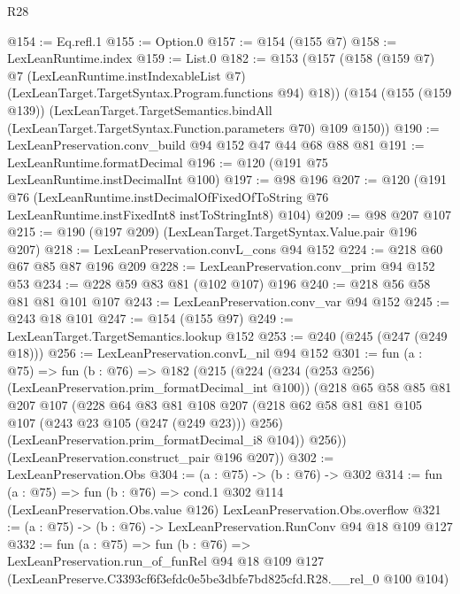 \begin{lexlean}{R28}
\begin{coremodule}
@154 := Eq.refl.{1}
@155 := Option.{0}
@157 := @154 (@155 @7)
@158 := LexLeanRuntime.index
@159 := List.{0}
@182 := @153
    (@157
      (@158
        (@159 @7)
        @7
        (LexLeanRuntime.instIndexableList @7)
        (LexLeanTarget.TargetSyntax.Program.functions @94)
        @18))
    (@154
      (@155 (@159 @139))
      (LexLeanTarget.TargetSemantics.bindAll
        (LexLeanTarget.TargetSyntax.Function.parameters @70)
        @109
        @150))
@190 := LexLeanPreservation.conv_build @94 @152 @47 @44 @68 @88 @81
@191 := LexLeanRuntime.formatDecimal
@196 := @120 (@191 @75 LexLeanRuntime.instDecimalInt @100)
@197 := @98 @196
@207 := @120
    (@191
      @76
      (LexLeanRuntime.instDecimalOfFixedOfToString
        @76
        LexLeanRuntime.instFixedInt8
        instToStringInt8)
      @104)
@209 := @98 @207 @107
@215 := @190 (@197 @209) (LexLeanTarget.TargetSyntax.Value.pair @196 @207)
@218 := LexLeanPreservation.convL_cons @94 @152
@224 := @218 @60 @67 @85 @87 @196 @209
@228 := LexLeanPreservation.conv_prim @94 @152 @53
@234 := @228 @59 @83 @81 (@102 @107) @196
@240 := @218 @56 @58 @81 @81 @101 @107
@243 := LexLeanPreservation.conv_var @94 @152
@245 := @243 @18 @101
@247 := @154 (@155 @97)
@249 := LexLeanTarget.TargetSemantics.lookup @152
@253 := @240 (@245 (@247 (@249 @18)))
@256 := LexLeanPreservation.convL_nil @94 @152
@301 := fun (a : @75) =>
  fun (b : @76) =>
  @182
    (@215
      (@224
        (@234 (@253 @256) (LexLeanPreservation.prim_formatDecimal_int @100))
        (@218
          @65
          @58
          @85
          @81
          @207
          @107
          (@228
            @64
            @83
            @81
            @108
            @207
            (@218 @62 @58 @81 @81 @105 @107 (@243 @23 @105 (@247 (@249 @23))) @256)
            (LexLeanPreservation.prim_formatDecimal_i8 @104))
          @256))
      (LexLeanPreservation.construct_pair @196 @207))
@302 := LexLeanPreservation.Obs
@304 := (a : @75) -> (b : @76) -> @302
@314 := fun (a : @75) =>
  fun (b : @76) =>
  cond.{1} @302 @114 (LexLeanPreservation.Obs.value @126) LexLeanPreservation.Obs.overflow
@321 := (a : @75) -> (b : @76) -> LexLeanPreservation.RunConv @94 @18 @109 @127
@332 := fun (a : @75) =>
  fun (b : @76) =>
  LexLeanPreservation.run_of_funRel
    @94
    @18
    @109
    @127
    (LexLeanPreserve.C3393cf6f3efdc0e5be3dbfe7bd825cfd.R28.__rel_0 @100 @104)
\end{coremodule}
\end{lexlean}

